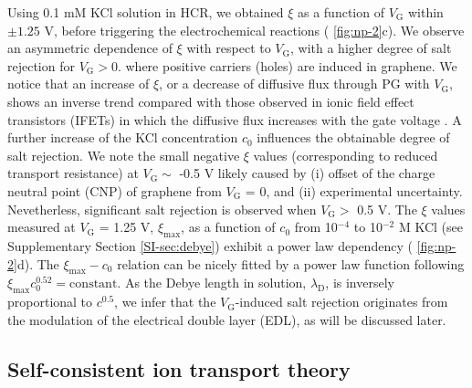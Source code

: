 Using 0.1 mM KCl solution in HCR, we obtained $\xi$ as a function of
$V_{\mathrm{G}}$ within $\pm1.25$ V, before triggering the
electrochemical reactions ( \autoref{fig:np-2}c). We observe an
asymmetric dependence of $\xi$ with respect to $V_{\mathrm{G}}$, with
a higher degree of salt rejection for $V_{\mathrm{G}}>0$. where
positive carriers (holes) are induced in graphene. We notice that an
increase of $\xi$, or a decrease of diffusive flux through PG with
$V_{\mathrm{G}}$, shows an inverse trend compared with those
observed in ionic field effect transistors (IFETs) in which the
diffusive flux increases with the gate voltage
\cite{Nam_2009_IFET_sub10nm,Cheng_2018_gate_gox}. A further increase of the KCl
concentration $c_{0}$ influences the obtainable degree of salt
rejection. 
{
We note the small negative $\xi$ values (corresponding to reduced transport resistance) at $V_{\mathrm{G}} \sim{}$ -0.5 V
likely caused by (i) offset of the charge neutral point (CNP) of graphene from $V_{\mathrm{G}}$ = 0, and (ii) experimental uncertainty.
Nevetherless, significant salt rejection is observed when $V_{\mathrm{G}}>$ 0.5 V.
}
The $\xi$ values measured at $V_{\mathrm{G}}$ = 1.25 V,
$\xi_{\mathrm{max}}$, as a function of $c_{0}$ from 10$^{-4}$ to
10$^{-2}$ M KCl (see Supplementary Section \autoref{SI-sec:debye}) exhibit
a power law dependency ( \autoref{fig:np-2}d). The
$\xi_{\mathrm{max}}-c_{0}$ relation can be nicely fitted by a power
law function following
$\xi_{\mathrm{max}} c_{0}^{0.52} = \mathrm{constant}$. As the Debye
length in solution, $\lambda_{\mathrm{D}}$, is inversely proportional
to $c^{0.5}$, we infer that the $V_{\mathrm{G}}$-induced salt
rejection originates from the modulation of the electrical double
layer (EDL), as will be discussed later.

\subsection{Self-consistent ion transport theory}
\label{sec:theory}

